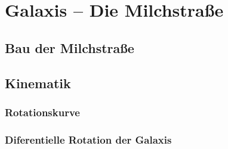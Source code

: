 \part{Galaxis -- Die Milchstraße}
\chapter{Bau der Milchstraße}
\chapter{Kinematik}
\section{Rotationskurve}
\section{Diferentielle Rotation der Galaxis}
